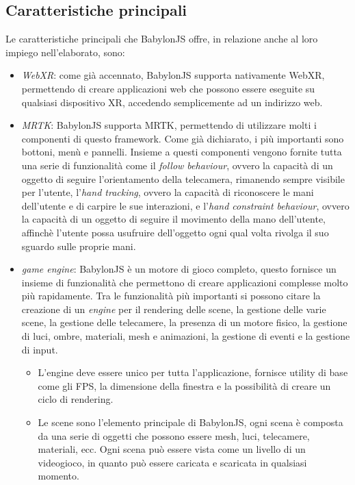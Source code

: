 \subsection{Caratteristiche principali}\label{subsec:BabylonJS_caratteristiche}
Le caratteristiche principali che BabylonJS offre, in relazione anche al loro impiego nell'elaborato, sono:
\begin{itemize}
    \item \textit{WebXR}: come già accennato, BabylonJS supporta nativamente WebXR, permettendo di creare applicazioni web che possono essere eseguite su qualsiasi dispositivo XR, 
    accedendo semplicemente ad un indirizzo web. 
    \item \textit{MRTK}: BabylonJS supporta MRTK, permettendo di utilizzare molti i componenti di questo framework. Come già dichiarato, i più importanti sono
    bottoni, menù e pannelli. Insieme a questi componenti vengono fornite tutta una serie di funzionalità come il \textit{follow behaviour}, ovvero la capacità di un oggetto di 
    seguire l'orientamento della telecamera, rimanendo sempre visibile per l'utente, l'\textit{hand tracking}, ovvero la capacità di riconoscere le mani dell'utente e di 
    carpire le sue interazioni, e l'\textit{hand constraint behaviour}, ovvero la capacità di un oggetto di seguire il movimento della mano dell'utente, affinchè l'utente possa
    usufruire dell'oggetto ogni qual volta rivolga il suo sguardo sulle proprie mani.
    \item \textit{game engine}: BabylonJS è un motore di gioco completo, questo fornisce un insieme di funzionalità che permettono di creare applicazioni complesse molto più rapidamente.
    Tra le funzionalità più importanti si possono citare la creazione di un \textit{engine} per il rendering delle scene, la gestione delle varie scene, la gestione delle telecamere,
    la presenza di un motore fisico, la gestione di luci, ombre, materiali, mesh e animazioni, la gestione di eventi e la gestione di input.
    \begin{itemize}
        \item L'engine deve essere unico per tutta l'applicazione, fornisce utility di base come gli FPS, la dimensione della finestra e la possibilità di creare un ciclo di rendering.
        \item Le scene sono l'elemento principale di BabylonJS, ogni scena è composta da una serie di oggetti che possono essere mesh, luci, telecamere, materiali, ecc. Ogni scena
        può essere vista come un livello di un videogioco, in quanto può essere caricata e scaricata in qualsiasi momento.

\end{itemize}
\end{itemize}
